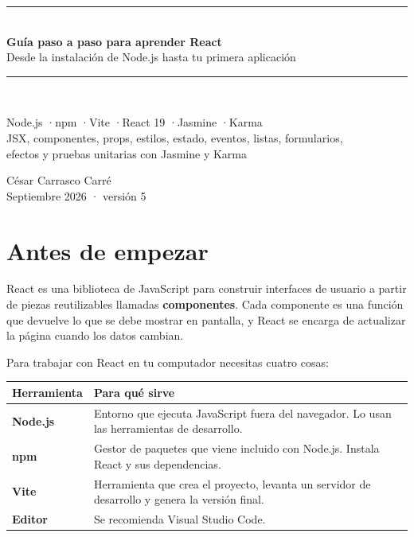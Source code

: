 \documentclass[11pt,a4paper]{article}
\begin{document}
\begin{titlepage}
\centering
\vspace*{3cm}
{\color{reactblue}\rule{\linewidth}{1.5pt}}\\[1.2em]
{\Huge\bfseries\color{reactdark} Guía paso a paso para aprender React}\\[0.8em]
{\Large Desde la instalación de Node.js hasta tu primera aplicación}\\[1em]
{\color{reactblue}\rule{\linewidth}{1.5pt}}\\[3em]
\begin{minipage}{0.8\linewidth}
\centering\large
Node.js \quad·\quad npm \quad·\quad Vite \quad·\quad React 19 \quad·\quad Jasmine \quad·\quad Karma\\[0.5em]
JSX, componentes, props, estilos, estado, eventos, listas, formularios,\\efectos y pruebas unitarias con Jasmine y Karma
\end{minipage}
\vfill
{\large César Carrasco Carré}\\[0.3em]
{\color{com}Septiembre 2026 · versión 5}
\end{titlepage}

\tableofcontents
\newpage

\section{Antes de empezar}

React es una biblioteca de JavaScript para construir interfaces de usuario a partir de piezas reutilizables llamadas \textbf{componentes}. Cada componente es una función que devuelve lo que se debe mostrar en pantalla, y React se encarga de actualizar la página cuando los datos cambian.

Para trabajar con React en tu computador necesitas cuatro cosas:

\begin{center}
\begin{tabular}{>{\bfseries}l p{10cm}}
\toprule
Herramienta & Para qué sirve \\
\midrule
Node.js & Entorno que ejecuta JavaScript fuera del navegador. Lo usan las herramientas de desarrollo. \\
npm & Gestor de paquetes que viene incluido con Node.js. Instala React y sus dependencias. \\
Vite & Herramienta que crea el proyecto, levanta un servidor de desarrollo y genera la versión final. \\
Editor & Se recomienda Visual Studio Code. \\
\bottomrule
\end{tabular}
\end{center}
\end{document}

